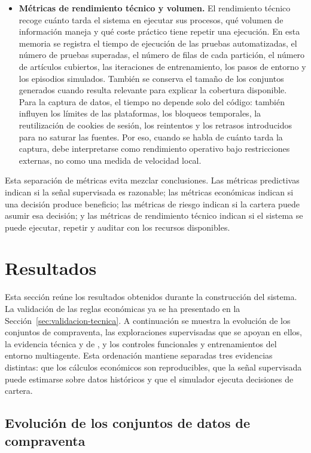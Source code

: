 \begin{itemize}
  \item \textbf{Métricas de rendimiento técnico y volumen.} El rendimiento técnico recoge cuánto tarda el sistema en ejecutar sus procesos, qué volumen de información maneja y qué coste práctico tiene repetir una ejecución. En esta memoria se registra el tiempo de ejecución de las pruebas automatizadas, el número de pruebas superadas, el número de filas de cada partición, el número de artículos cubiertos, las iteraciones de entrenamiento, los pasos de entorno y los episodios simulados. También se conserva el tamaño de los conjuntos generados cuando resulta relevante para explicar la cobertura disponible. Para la captura de datos, el tiempo no depende solo del código: también influyen los límites de las plataformas, los bloqueos temporales, la reutilización de cookies de sesión, los reintentos y los retrasos introducidos para no saturar las fuentes. Por eso, cuando se habla de cuánto tarda la captura, debe interpretarse como rendimiento operativo bajo restricciones externas, no como una medida de velocidad local. 
\end{itemize}

Esta separación de métricas evita mezclar conclusiones. Las métricas predictivas indican si la señal supervisada es razonable; las métricas económicas indican si una decisión produce beneficio; las métricas de riesgo indican si la cartera puede asumir esa decisión; y las métricas de rendimiento técnico indican si el sistema se puede ejecutar, repetir y auditar con los recursos disponibles.

\section{Resultados}

Esta sección reúne los resultados obtenidos durante la construcción del sistema. La validación de las reglas económicas ya se ha presentado en la Sección~\ref{sec:validacion-tecnica}. A continuación se muestra la evolución de los conjuntos de compraventa, las exploraciones supervisadas que se apoyan en ellos, la evidencia técnica y de , y los controles funcionales y entrenamientos del entorno multiagente. Esta ordenación mantiene separadas tres evidencias distintas: que los cálculos económicos son reproducibles, que la señal supervisada puede estimarse sobre datos históricos y que el simulador  ejecuta decisiones de cartera.

\subsection{Evolución de los conjuntos de datos de compraventa}
\label{sec:evolucion-datasets}


